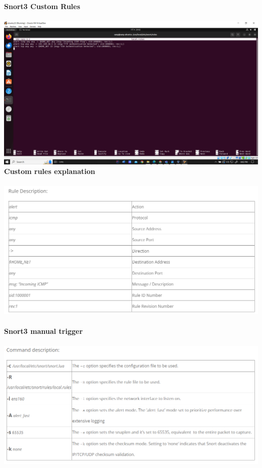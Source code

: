 \documentclass{article}
\begin{document}
\textbf{Snort3 Custom Rules}\\\\
\includegraphics[width=1.0\textwidth]{images/custom_rules.PNG}
\clearpage
\textbf{\hspace{-\3.5cm}Custom rules explanation}\\\\
\includegraphics[width=1.0\textwidth]{images/custom_rules_desc.PNG}\\\\
\textbf{Snort3 manual trigger}\\\\
\includegraphics[width=1.0\textwidth]{images/manual_trig_3.PNG}\\\\
\end{document}
